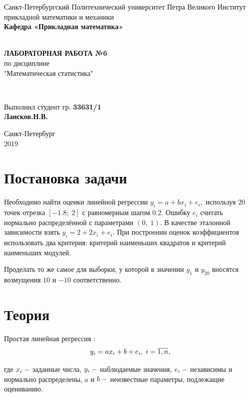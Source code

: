 \documentclass[12pt]{article}
\renewcommand{\listoffigures}{\begingroup  %
\tocsection
\tocfile{\listfigurename}{lof}
\endgroup}
\renewcommand{\listoftables}{\begingroup  %
\tocsection
\tocfile{\listtablename}{lot}
\endgroup}
\begin{document}
\begin{titlepage}
	\center
		Санкт-Петербургский Политехнический 
		университет Петра Великого
		Институт прикладной математики и механики
		\\ \textbf{Кафедра «Прикладная математика»}

	\vfill ~
	\textbf{
		\\ \large ЛАБОРАТОРНАЯ РАБОТА №6
	}
	\\	по дисциплине 
	\\	"Математическая статистика"

	\vfill ~

	Выполнил студент гр. \textbf{33631/1} \\
	\textbf{Лансков.Н.В.} \\ 

\vfill

{\large}	Санкт-Петербург
\\ 2019
\end{titlepage}


\tableofcontents 
\newpage
\listoffigures
\newpage
\listoftables
\newpage

\section{Постановка задачи}

Необходимо найти оценки линейной регрессии $y_i=a+bx_i+e_i,$ используя $20$ точек отрезка $[-1.8;\;2]$ с равномерным шагом $0.2.$ Ошибку $e_i$ считать нормально распределённой с параметрами $(0,\;1).$ В качестве эталонной зависимости взять $y_i=2+2x_i+e_i.$ При построении оценок коэффициентов использовать два критерия: критерий наименьших квадратов и критерий наименьших модулей.

Проделать то же самое для выборки, у которой в значении $y_1$ и $y_{20}$ вносятся возмущения $10$ и $-10$ соответственно.

\section{Теория}

Простая линейная регрессия \cite{lin_reg}:
\begin{equation}
    y_i=ax_i+b+e_i,\;i=\overline{1,n},\hfill
\end{equation}

где $x_i\;\--$ заданные числа, $y_i\;\--$ наблюдаемые значения, $e_i\;\--$ независимы и нормально распределены, $a$ и $b\;\--$ неизвестные параметры, подлежащие оцениванию.
\end{document}
